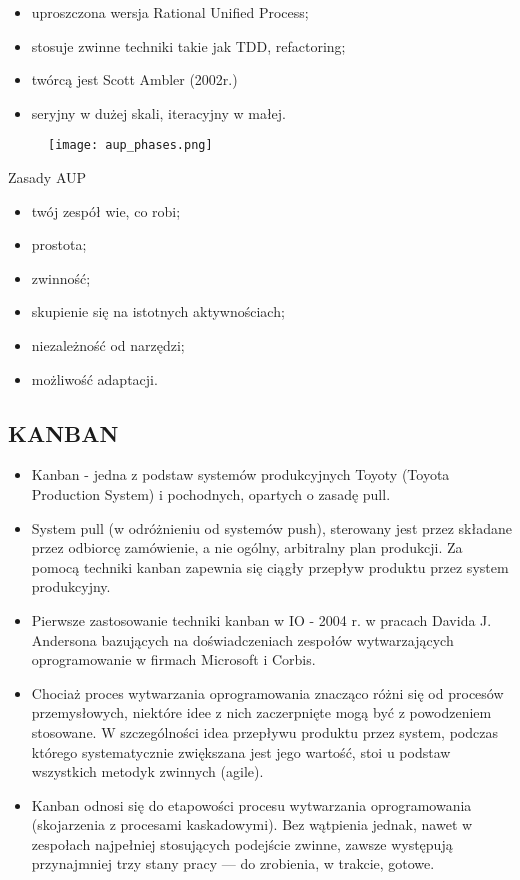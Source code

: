 \documentclass[a4paper]{article}
\begin{document}
\begin{itemize}
    \item uproszczona wersja Rational Unified Process;
    \item stosuje zwinne techniki takie jak TDD, refactoring;
    \item twórcą jest Scott Ambler (2002r.)
    \item seryjny w dużej skali, iteracyjny w małej.
\end{itemize}


\begin{figure}[!h]
    \texttt{[image: aup\_phases.png]}
\end{figure}


Zasady AUP
    \begin{itemize}
        \item twój zespół wie, co robi;
        \item prostota;
        \item zwinność;
        \item skupienie się na istotnych aktywnościach;
        \item niezależność od narzędzi;
        \item możliwość adaptacji.
    \end{itemize}


\subsection{KANBAN}
\begin{itemize}
    \item Kanban - jedna z podstaw systemów produkcyjnych
Toyoty (Toyota Production System) i pochodnych,
opartych o zasadę pull.
    \item System pull (w odróżnieniu od systemów push), sterowany
jest przez składane przez odbiorcę zamówienie, a
nie ogólny, arbitralny plan produkcji. Za pomocą
techniki kanban zapewnia się ciągły przepływ
produktu przez system produkcyjny.
    \item Pierwsze zastosowanie techniki kanban w IO - 2004 r.
w pracach Davida J. Andersona bazujących na
doświadczeniach zespołów wytwarzających
oprogramowanie w firmach Microsoft i Corbis.
    \item Chociaż proces wytwarzania oprogramowania znacząco
różni się od procesów przemysłowych, niektóre idee z
nich zaczerpnięte mogą być z powodzeniem stosowane.
W szczególności idea przepływu produktu przez
system, podczas którego systematycznie zwiększana
jest jego wartość, stoi u podstaw wszystkich metodyk
zwinnych (agile).
    \item Kanban odnosi się do etapowości procesu wytwarzania
oprogramowania (skojarzenia z procesami
kaskadowymi). Bez wątpienia jednak, nawet w
zespołach najpełniej stosujących podejście zwinne,
zawsze występują przynajmniej trzy stany pracy — do
zrobienia, w trakcie, gotowe.
\end{itemize}
\end{document}
